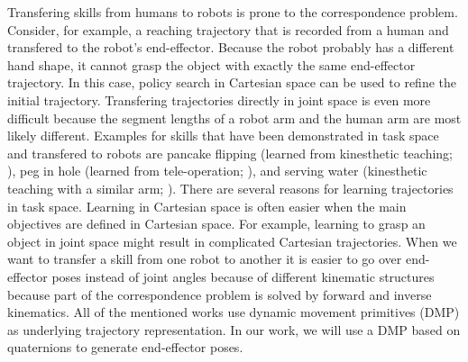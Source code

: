 \documentclass{svproc}
\begin{document}
Transfering skills from humans to robots %
is prone to the correspondence problem.
Consider, for example, a reaching trajectory that is recorded from a human
and transfered to the robot's end-effector. Because the robot probably has
a different hand shape,
it cannot grasp the object with exactly the same end-effector trajectory.
In this case, policy search in Cartesian space can be used to refine the
initial trajectory.
Transfering trajectories directly in joint space is even more difficult
because the segment lengths of a robot arm and the human arm are most likely
different.
Examples for skills that have been demonstrated in task space and transfered
to robots are pancake flipping (learned from kinesthetic teaching;
\cite{Kormushev2010}), peg in hole (learned from  tele-operation;
\cite{Krueger2014}), and serving water (kinesthetic teaching with
a similar arm; \cite{Pastor2009}).
There are several reasons for learning trajectories in task space.
Learning in Cartesian space is often easier when the main objectives are
defined in Cartesian space. For example, learning to grasp an object in
joint space might result in complicated Cartesian trajectories.
When we want to transfer a skill from one robot to another it is easier to
go over end-effector poses instead of joint angles because of different
kinematic structures \cite{Pastor2009} because part of the correspondence
problem is solved by forward and inverse kinematics.
All of the mentioned works use dynamic movement primitives (DMP) as
underlying trajectory representation.
In our work, we will use a DMP based on quaternions \cite{Ude2014}
to generate end-effector poses.

\end{document}
